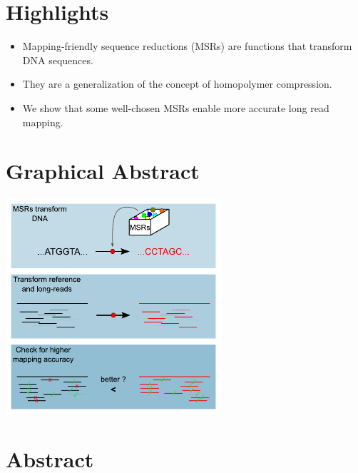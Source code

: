 \documentclass[
  11pt,
  twoside,
  BCOR=10mm,
  listof=totoc]{scrbook}
\begin{document}
\newcommand{\lmer}{$\ell$-mer\xspace}
\newcommand{\lmers}{$\ell$-mers\xspace}
\newcommand{\iscomp}{\textsc{IsComp}\xspace}
\newcommand{\rccore}{RC-core-insensitive\xspace}
\newcommand{\minimap}{\texttt{minimap2}\xspace}
\newcommand{\winnowmap}{\texttt{winnowmap2}\xspace}
\newcommand{\msr}[1]{MSR$_{\text{#1}}$}

\hypertarget{highlights}{%
\section*{Highlights}\label{highlights}}

\begin{itemize}
\item
  Mapping-friendly sequence reductions (MSRs) are functions that transform DNA sequences.
\item
  They are a generalization of the concept of homopolymer compression.
\item
  We show that some well-chosen MSRs enable more accurate long read mapping.
\end{itemize}

\hypertarget{graphical-abstract}{%
\section*{Graphical Abstract}\label{graphical-abstract}}

\begin{center}
\includegraphics[width=0.6\textwidth]{figures/HPC-MSRs/abstract.pdf}
\end{center}

\hypertarget{hpc-abstract}{%
\section*{Abstract}\label{hpc-abstract}}
\end{document}
